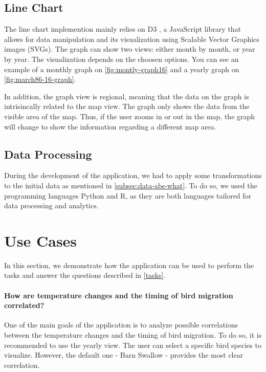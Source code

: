 \documentclass[journal]{vgtc}                %
\begin{document}
\subsection{Line Chart}

The line chart implemention mainly relies on D3 \cite{d3js}, a JavaScript library that allows for data manipulation and its visualization using Scalable Vector Graphics images (SVGs). The graph can show two views: either month by month, or year by year. The visualization depends on the choosen options. You can see an example of a monthly graph on \autoref{fig:montly-graph16} and a yearly graph on \autoref{fig:march86-16-graph}.

In addition, the graph view is regional, meaning that the data on the graph is intrisincally related to the map view. The graph only shows the data from the visible area of the map. Thus, if the user zooms in or out in the map, the graph will change to show the information regarding a different map area.

\subsection{Data Processing}

During the development of the application, we had to apply some transformations to the initial data as mentioned in \autoref{subsec:data-abs-what}. To do so, we used the programming languages Python and R, as they are both languages tailored for data processing and analytics.


\section{Use Cases}

In this section, we demonstrate how the application can be used to perform the tasks and answer the questions described in \autoref{tasks}.

\paragraph{How are temperature changes and the timing of bird migration correlated?}

One of the main goals of the application is to analyze possible correlations between the temperature changes and the timing of bird migration. To do so, it is recommended to use the yearly view. The user can select a specific bird species to visualize. However, the default one - Barn Swallow - provides the most clear correlation.
\end{document}
